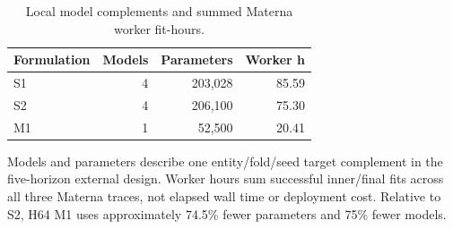 \begin{table}[t]
  \caption{Local model complements and summed Materna worker fit-hours.}
  \label{tab:efficiency}
  \centering
  \small
  \begin{tabular}{@{}lrrr@{}}
    \toprule
    Formulation & Models & Parameters & Worker h \\
    \midrule
    S1 & 4 & 203,028 & 85.59 \\
    S2 & 4 & 206,100 & 75.30 \\
    M1 & 1 &  52,500 & 20.41 \\
    \bottomrule
  \end{tabular}

  \vspace{2pt}
  \parbox{\columnwidth}{\footnotesize Models and parameters describe one
  entity/fold/seed target complement in the five-horizon external design.
  Worker hours sum successful inner/final fits across all three Materna
  traces, not elapsed wall time or deployment cost. Relative to S2, H64 M1
  uses approximately 74.5\% fewer parameters and 75\% fewer models.}
\end{table}
